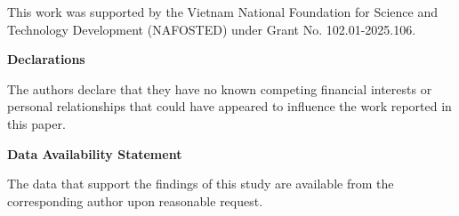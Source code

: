 \documentclass[]{interact}
\begin{document}
 This work was supported by the Vietnam National Foundation for Science and Technology Development (NAFOSTED) under Grant No. 102.01-2025.106.
 
\newpage
\textbf{Declarations}
			
			The authors declare that they have no known competing financial interests or personal relationships that could have appeared to influence the work reported in this paper.

\textbf{Data Availability Statement}

The data that support the findings of this study are available from the corresponding author upon reasonable request.
\end{document}
